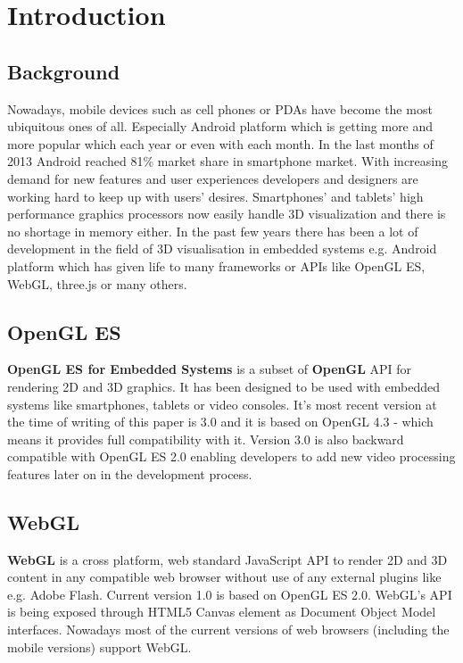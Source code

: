 \documentclass[a4paper,12pt]{article}
\begin{document}



\section{Introduction}

\subsection{Background}
Nowadays, mobile devices such as cell phones or PDAs have become the most ubiquitous ones of all.
Especially Android platform which is getting more and more popular which each year or even with each month.
In the last months of 2013 Android reached 81\% market share in smartphone market. 
With increasing demand for new features and user experiences developers and designers are working hard to keep up with users' desires.
Smartphones’ and tablets’ high performance graphics processors now easily handle 3D visualization and there is no shortage in memory either. 
In the past few years there has been a lot of development in the field of 3D visualisation in embedded systems e.g. Android platform which has given life to many frameworks or APIs like OpenGL ES, WebGL, three.js or many others.


\subsection{OpenGL ES}
\textbf{OpenGL ES for Embedded Systems} is a subset of \textbf{OpenGL} API for rendering 2D and 3D graphics.
It has been designed to be used with embedded systems like smartphones, tablets or video consoles.
It's most recent version at the time of writing of this paper is 3.0 and it is based on OpenGL 4.3 - which means it provides full compatibility with it. 
Version 3.0 is also backward compatible with OpenGL ES 2.0 enabling developers to add new video processing features later on in the development process.


\subsection{WebGL}
\textbf{WebGL} is a cross platform, web standard JavaScript API to render 2D and 3D content in any compatible web browser without use of any external plugins like e.g. Adobe Flash.
Current version 1.0 is based on OpenGL ES 2.0. WebGL's API is being exposed through HTML5 Canvas element as Document Object Model interfaces.
Nowadays most of the current versions of web browsers (including the mobile versions) support WebGL.
\end{document}
